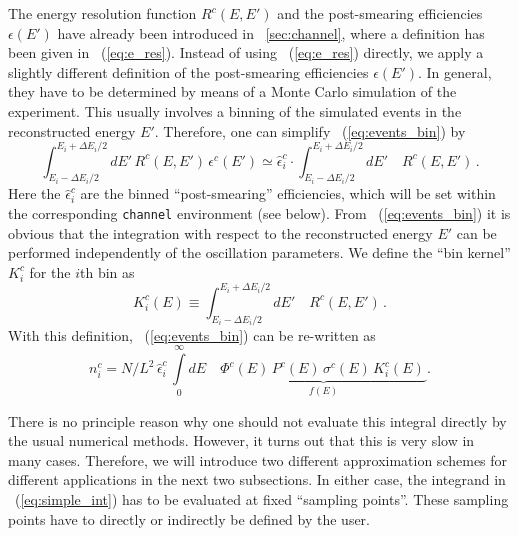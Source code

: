The energy resolution function $R^c(E,E')$ and the post-smearing
efficiencies $\epsilon(E')$ have already been introduced in 
\Sec~\ref{sec:channel}, where a definition
has been given in \eq~(\ref{eq:e_res}). Instead of using
 \eq~(\ref{eq:e_res}) directly, we apply a slightly different
definition of the post-smearing efficiencies $\epsilon(E')$. 
In general, they have to be
determined by means of a Monte Carlo simulation of the experiment. 
This usually involves a binning of the simulated events in the 
reconstructed energy $E'$. Therefore, one can simplify \eq~(\ref{eq:events_bin}) by
\begin{equation}
\label{eq:post_smearing}
\int_{E_i-\Delta E_i/2}^{E_i+\Delta E_i/2} dE' \, R^c(E,E') \, \epsilon^c(E')
 \simeq \hat\epsilon_i^c \cdot \int_{E_i-\Delta E_i/2}^{E_i+\Delta E_i/2} dE' 
\quad R^c(E,E')\,.
\end{equation}
Here the  $\hat\epsilon_i^c$ are the 
binned ``post-smearing'' efficiencies, which will be set within the corresponding {\tt channel} environment (see below).
From \eq~(\ref{eq:events_bin}) it is obvious that the integration with respect to the reconstructed energy $E'$ can be
performed independently of the oscillation parameters. We define
the ``bin kernel'' $K_i^c$ for the $i$th bin as
\begin{equation}
\label{eq:kernel}
K_i^c(E) \equiv \int_{E_i-\Delta E_i/2}^{E_i+\Delta E_i/2} dE' 
\quad R^c(E,E')\,.
\end{equation}
With this definition, \eq~(\ref{eq:events_bin}) can be re-written as
\begin{equation}
\label{eq:simple_int}
n_i^c=N/L^2 \,
\hat\epsilon_i^c \, \int\limits_0^\infty dE\quad  \underbrace{\Phi^c(E)\,
P^c(E)\,
\sigma^c(E) \, K_i^c(E)\,}_{f(E)}. 
\end{equation}

There is no principle reason why one should not evaluate this integral directly by the usual numerical methods. However, it turns out that this 
is very slow in many cases. Therefore, we will introduce two different approximation schemes for different applications in the next two subsections.
In either case, the integrand in \eq~(\ref{eq:simple_int}) has to be evaluated at fixed ``sampling points''. These sampling points have to directly 
or indirectly be defined by the user.

